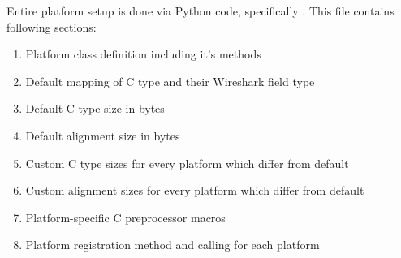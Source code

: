 \documentclass[A4paper,10pt,english]{sphinxmanual}
\begin{document}
Entire platform setup is done via Python code, specifically . This file contains following sections:
\begin{enumerate}
\item {} 
Platform class definition including it's methods

\item {} 
Default mapping of C type and their Wireshark field type

\item {} 
Default C type size in bytes

\item {} 
Default alignment size in bytes

\item {} 
Custom C type sizes for every platform which differ from default

\item {} 
Custom alignment sizes for every platform which differ from default

\item {} 
Platform-specific C preprocessor macros

\item {} 
Platform registration method and calling for each platform

\end{enumerate}
\end{document}
